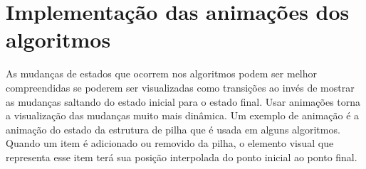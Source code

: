 \section{Implementação das animações dos algoritmos}
As mudanças de estados que ocorrem nos algoritmos podem ser melhor compreendidas se poderem ser visualizadas como transições ao invés de mostrar as mudanças saltando do estado inicial para o estado final. Usar animações torna a visualização das mudanças muito mais dinâmica. Um exemplo de animação é a animação do estado da estrutura de pilha que é usada em alguns algoritmos. Quando um item é adicionado ou removido da pilha, o elemento visual que representa esse item terá sua posição interpolada do ponto inicial ao ponto final.




